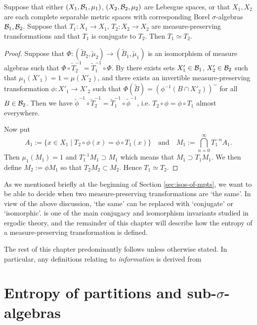 \begin{theorem} \label{thm:walters-2-6}
	Suppose that either $(X_1, \mathcal{B}_1, \mu_1)$, $(X_2, \mathcal{B}_2, \mu_2)$ are Lebesgue spaces, or that $X_1, X_2$ are each complete separable metric spaces with corresponding Borel $\sigma$-algebras $\mathcal{B}_1, \mathcal{B}_2$. Suppose that $T_1 : X_1 \to X_1$, $T_2 : X_2 \to X_2$ are measure-preserving transformations and that $T_1$ is conjugate to $T_2$. Then $T_1 \simeq T_2$.
	\begin{proof}
		Suppose that $\Phi : (\tilde{B}_2, \tilde{\mu}_2) \to (\tilde{B}_1, \tilde{\mu}_1)$ is an isomorphism of measure algebras such that $\Phi \circ \tilde{T}_2^{-1} = \tilde{T}_1^{-1} \circ \Phi$. By  there exists sets $X'_1 \in \mathcal{B}_1$, $X'_2 \in \mathcal{B}_2$ such that $\mu_1(X'_1) = 1 = \mu(X'_2)$, and there exists an invertible measure-preserving transformation $\phi : X'_1 \to X'_2$ such that $\Phi(\tilde{B}) = (\phi^{-1}(B \cap X'_2))^\sim$ for all $B \in \mathcal{B}_2$. Then we have $\tilde{\phi}^{-1} \circ \tilde{T}_2^{-1} = \tilde{T}_1^{-1} \circ \tilde{\phi}^{-1}$, i.e. $T_2 \circ \phi = \phi \circ T_1$ almost everywhere.
		
		Now put
		\[
			A_1 := \{x \in X_1 \mid T_2 \circ \phi(x) = \phi \circ T_1(x)\} \quad \text{and} \quad M_1 := \bigcap_{n = 0}^\infty{T_1^{-n}{A_1}}.
		\]
		Then $\mu_1(M_1) = 1$ and $T_1^{-1}{M_1} \supset M_1$ which means that $M_1 \supset T_1 M_1$. We then define $M_2 := \phi M_1$ so that $T_2 M_2 \subset M_2$. Hence $T_1 \simeq T_2$.
	\end{proof}
\end{theorem}

As we mentioned briefly at the beginning of Section \ref{sec:isos-of-mpts}, we want to be able to decide when two measure-preserving transformations are `the same'. In view of the above discussion, `the same' can be replaced with `conjugate' or `isomorphic'.  is one of the main conjugacy and isomorphism invariants studied in ergodic theory, and the remainder of this chapter will describe how the entropy of a measure-preserving transformation is defined.

The rest of this chapter predominantly follows \cite[Chapter 4]{walters:intro-to-ergodic-theory} unless otherwise stated. In particular, any definitions relating to \emph{information} is derived from \cite[p33-34]{parry-pollicott:zeta-fns-periodic-orbits}

\section{Entropy of partitions and sub-\texorpdfstring{$\sigma$}{sigma}-algebras}
